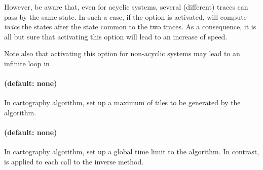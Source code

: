 However, be aware that, even for acyclic systems, several (different) traces can pass by the same state.
In such a case, if the  option is activated, \imitator{} will compute \emph{twice} the states after the state common to the two traces.
As a consequence, it is all but sure that activating this option will lead to an increase of speed.

Note also that activating this option for non-acyclic systems may lead to an infinite loop in \imitator{}.


\paragraph{ (default: none)}

In cartography algorithm, set up a maximum of tiles to be generated by the algorithm.


\paragraph{ (default: none)}

In cartography algorithm, set up a global time limit to the algorithm.
In contrast,  is applied to each call to the inverse method.


%
%
%
%
%

